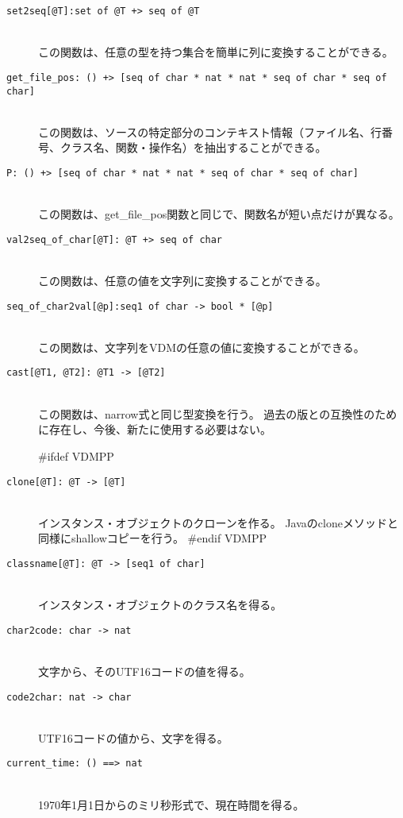 \documentclass[\pformat,12pt]{jarticle}
\begin{document}
\begin{description}
\item[\texttt{set2seq[@T]:set of @T +> seq of @T}] \mbox{}\\
この関数は、任意の型を持つ集合を簡単に列に変換することができる。

\item[\texttt{get\_file\_pos: () +> [seq of char * nat
* nat * seq of char * seq of char]}] \mbox{}\\
この関数は、ソースの特定部分のコンテキスト情報（ファイル名、行番号、クラス名、関数・操作名）を抽出することができる。

\item[\texttt{P: () +> [seq of char * nat
* nat * seq of char * seq of char]}] \mbox{}\\
この関数は、get\_file\_pos関数と同じで、関数名が短い点だけが異なる。

\item[\texttt{val2seq\_of\_char[@T]: @T +> seq of char}] \mbox{}\\
この関数は、任意の値を文字列に変換することができる。

\item[\texttt{seq\_of\_char2val[@p]:seq1 of char -> bool * [@p]}] \mbox{}\\
この関数は、文字列をVDMの任意の値に変換することができる。

\item[\texttt{cast[@T1, @T2]: @T1 -> [@T2]}] \mbox{}\\
この関数は、narrow式と同じ型変換を行う。
過去の版との互換性のために存在し、今後、新たに使用する必要はない。

#ifdef VDMPP
\item[\texttt{clone[@T]: @T -> [@T]}] \mbox{}\\
インスタンス・オブジェクトのクローンを作る。
Javaのcloneメソッドと同様にshallowコピーを行う。
#endif VDMPP

\item[\texttt{classname[@T]: @T -> [seq1 of char]}] \mbox{}\\
インスタンス・オブジェクトのクラス名を得る。

\item[\texttt{char2code: char -> nat}] \mbox{}\\
文字から、そのUTF16コードの値を得る。

\item[\texttt{code2char: nat -> char}] \mbox{}\\
UTF16コードの値から、文字を得る。

\item[\texttt{current\_time: () ==> nat}] \mbox{}\\
1970年1月1日からのミリ秒形式で、現在時間を得る。

\end{description}
\end{document}
